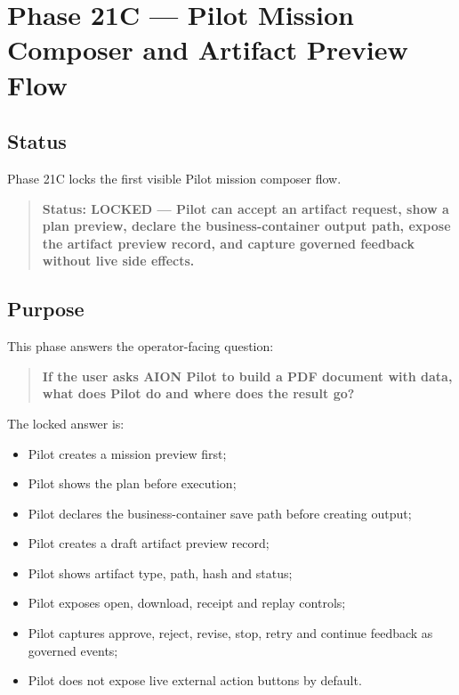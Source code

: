 \section{Phase 21C --- Pilot Mission Composer and Artifact Preview Flow}
\label{sec:aion-phase21c-pilot-mission-composer-artifact-preview}

\subsection{Status}

Phase 21C locks the first visible Pilot mission composer flow.

\begin{quote}
\textbf{Status: LOCKED --- Pilot can accept an artifact request, show a plan preview, declare the business-container output path, expose the artifact preview record, and capture governed feedback without live side effects.}
\end{quote}

\subsection{Purpose}

This phase answers the operator-facing question:

\begin{quote}
\textbf{If the user asks AION Pilot to build a PDF document with data, what does Pilot do and where does the result go?}
\end{quote}

The locked answer is:

\begin{itemize}
  \item Pilot creates a mission preview first;
  \item Pilot shows the plan before execution;
  \item Pilot declares the business-container save path before creating output;
  \item Pilot creates a draft artifact preview record;
  \item Pilot shows artifact type, path, hash and status;
  \item Pilot exposes open, download, receipt and replay controls;
  \item Pilot captures approve, reject, revise, stop, retry and continue feedback as governed events;
  \item Pilot does not expose live external action buttons by default.
\end{itemize}


